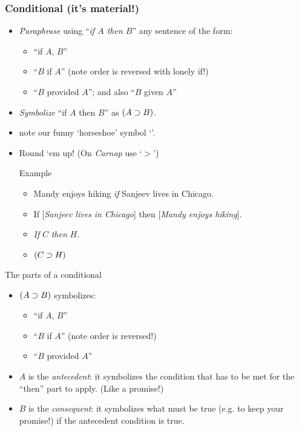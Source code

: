 \begin{frame}
  \frametitle{Conditional (it's material!)}

  \begin{itemize}[<+->]
  \item \emph{Paraphrase} using ``\emph{if $A$ then $B$}'' any sentence of the form:
  \begin{itemize}[<+->]
  \item ``if $A$, $B$''
  \item ``$B$ if $A$'' (note order is reversed with lonely if!)
  \item ``$B$ provided $A$'';  and also  ``$B$ given $A$''
  \end{itemize}
  \item \emph{Symbolize} ``if $A$ then $B$'' as
  \emph{$(A \supset B)$}.
\item[] note our funny `horseshoe' symbol `\eif'.  \item[] \centerline{Round `em up! (On \textit{Carnap} use `$>$')}

  \begin{block}{Example}
  \begin{itemize}[<+->]
  \item Mandy enjoys hiking \emph{if} Sanjeev lives in Chicago.

  \item If [\emph{Sanjeev lives in Chicago}] then [\emph{Mandy enjoys hiking}].

  \item \emph{If} $C$ \emph{then} $H$.

  \item $(C \supset H)$
  \end{itemize}
  \end{block}
  \end{itemize}
\end{frame}

\begin{frame}{The parts of a conditional}

\begin{itemize}
  \item \emph{$(A \supset B)$} symbolizes:
  \begin{itemize}
    \item ``if $A$, $B$''
    \item ``$B$ if $A$'' (note order is reversed!)
    \item ``$B$ provided $A$''
  \end{itemize}
  \item $A$ is the \emph{antecedent}: it symbolizes the condition that has to
  be met for the ``then'' part to apply. (Like a promise!)
  \item $B$ is the \emph{consequent}: it symbolizes what must be true (e.g. to keep your promise!)
  if the antecedent condition is true.
\end{itemize}
\end{frame}

